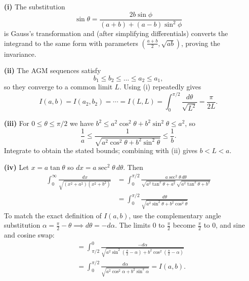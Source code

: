 \begin{solution}
\textbf{(i)} The substitution
\[\sin\theta=\frac{2b\sin\phi}{(a+b)+(a-b)\sin^2\phi}\]
is Gauss's transformation and (after simplifying differentials) converts the integrand to the same form with parameters $(\tfrac{a+b}{2},\sqrt{ab})$, proving the invariance.

\textbf{(ii)} The AGM sequences satisfy
\[b_1\le b_2\le\dots\le a_2\le a_1,\]
so they converge to a common limit $L$. Using (i) repeatedly gives
\[I(a,b)=I(a_2,b_2)=\cdots=I(L,L)=\int_0^{\pi/2}\frac{d\theta}{\sqrt{L^2}}=\frac{\pi}{2L}.
\]

\textbf{(iii)} For $0\le\theta\le\pi/2$ we have $b^2\le a^2\cos^2\theta+b^2\sin^2\theta\le a^2$, so
\[\frac{1}{a}\le\frac{1}{\sqrt{a^2\cos^2\theta+b^2\sin^2\theta}}\le\frac{1}{b}.
\]
Integrate to obtain the stated bounds; combining with (ii) gives $b<L<a$.

\textbf{(iv)} Let $x=a\tan\theta$ so $dx=a\sec^2\theta\,d\theta$. Then
\begin{align*}
\int_0^{\infty}\frac{dx}{\sqrt{(x^2+a^2)(x^2+b^2)}}
&=\int_0^{\pi/2}\frac{a\sec^2\theta\,d\theta}{\sqrt{a^2\tan^2\theta+a^2}\,\sqrt{a^2\tan^2\theta+b^2}}\\
&=\int_0^{\pi/2}\frac{d\theta}{\sqrt{a^2\sin^2\theta+b^2\cos^2\theta}}
\end{align*}
To match the exact definition of $I(a,b)$, use the complementary angle substitution $\alpha = \frac{\pi}{2} - \theta \implies d\theta = -d\alpha$. The limits $0$ to $\frac{\pi}{2}$ become $\frac{\pi}{2}$ to $0$, and sine and cosine swap:
\begin{align*}
&= \int_{\pi/2}^0 \frac{-d\alpha}{\sqrt{a^2\sin^2(\frac{\pi}{2} - \alpha)+b^2\cos^2(\frac{\pi}{2} - \alpha)}} \\
&= \int_0^{\pi/2} \frac{d\alpha}{\sqrt{a^2\cos^2\alpha+b^2\sin^2\alpha}} = I(a,b).
\end{align*}


\end{solution}

